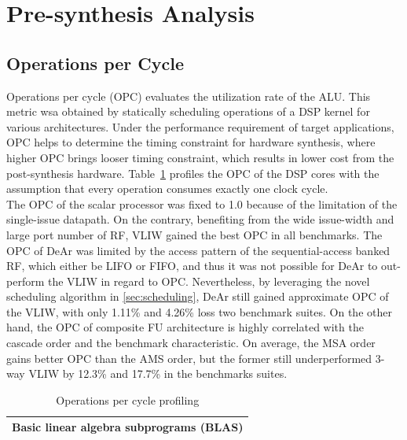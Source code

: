 \section{Pre-synthesis Analysis}
{
    \subsection{Operations per Cycle}
    Operations per cycle (OPC) evaluates the utilization rate of the ALU.
    This metric wsa obtained by statically scheduling operations of a DSP kernel for various architectures.
    Under the performance requirement of target applications, OPC helps to determine the timing constraint for hardware synthesis, 
    where higher OPC brings looser timing constraint, which results in lower cost from the post-synthesis hardware.
    Table~\ref{tab:opc} profiles the OPC of the DSP cores with the assumption that every operation consumes exactly one clock cycle.
    \\\indent The OPC of the scalar processor was fixed to 1.0 because of the limitation of the single-issue datapath.
    On the contrary, benefiting from the wide issue-width and large port number of RF, VLIW gained the best OPC in all benchmarks.
    The OPC of DeAr was limited by the access pattern of the sequential-access banked RF, which either be LIFO or FIFO, 
    and thus it was not possible for DeAr to out-perform the VLIW in regard to OPC.
    Nevertheless, by leveraging the novel scheduling algorithm in \ref{sec:scheduling},  
    DeAr still gained approximate OPC of the VLIW, with only 1.11\% and 4.26\% loss two benchmark suites.
    On the other hand, the OPC of composite FU architecture is highly correlated with the cascade order and the benchmark characteristic. 
    On average, the MSA order gains better OPC than the AMS order, 
    but the former still underperformed 3-way VLIW by 12.3\% and 17.7\% in the benchmarks suites.
    \begin{table}[!ht]
        \centering
        \caption{Operations per cycle profiling}
        \label{tab:opc}
        \resizebox{\columnwidth}{!}
        {
            \begin{tabular}{|c|c|c|c|c|c|c|c|c|c|}
                \hline
                \multicolumn{10}{|c|}{\textbf{Basic linear algebra subprograms (BLAS)}} \\ \hline

\end{tabular}}
\end{table}}
